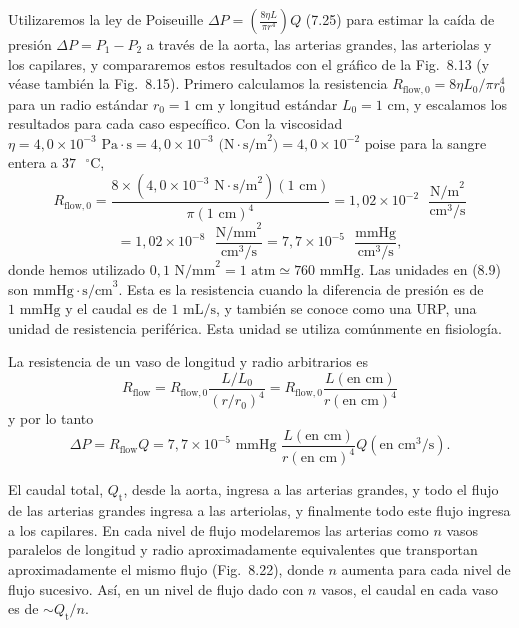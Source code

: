 \documentclass[12pt]{book}
\begin{document}
Utilizaremos la ley de Poiseuille $\Delta P = \left(\frac{8\eta L}{\pi r^4}\right) Q$ (7.25) para estimar la caída de presión $\Delta P = P_1 - P_2$ a través de la aorta, las arterias grandes, las arteriolas y los capilares, y compararemos estos resultados con el gráfico de la Fig.~8.13 (y véase también la Fig.~8.15). Primero calculamos la resistencia $R_{\text{flow},0} = 8\eta L_0/\pi r_0^4$ para un radio estándar $r_0 = 1\text{ cm}$ y longitud estándar $L_0 = 1\text{ cm}$, y escalamos los resultados para cada caso específico. Con la viscosidad $\eta = 4{,}0 \times 10^{-3}\text{ Pa}\cdot\text{s} = 4{,}0 \times 10^{-3}\text{ (N}\cdot\text{s/m}^2) = 4{,}0 \times 10^{-2}\text{ poise}$ para la sangre entera a $37\text{ }^\circ\text{C}$,
\begin{equation}
R_{\text{flow},0} = \frac{8 \times (4{,}0 \times 10^{-3}\text{ N}\cdot\text{s/m}^2)(1\text{ cm})}{\pi(1\text{ cm})^4} = 1{,}02 \times 10^{-2}\text{ }\frac{\text{N/m}^2}{\text{cm}^3\text{/s}}
\label{eq:88}
\end{equation}
\begin{equation}
= 1{,}02 \times 10^{-8}\text{ }\frac{\text{N/mm}^2}{\text{cm}^3\text{/s}} = 7{,}7 \times 10^{-5}\text{ }\frac{\text{mmHg}}{\text{cm}^3\text{/s}},
\label{eq:89}
\end{equation}
donde hemos utilizado $0{,}1\text{ N/mm}^2 = 1\text{ atm} \simeq 760\text{ mmHg}$. Las unidades en (8.9) son $\text{mmHg}\cdot\text{s/cm}^3$. Esta es la resistencia cuando la diferencia de presión es de $1\text{ mmHg}$ y el caudal es de $1\text{ mL/s}$, y también se conoce como una URP, una unidad de resistencia periférica. Esta unidad se utiliza comúnmente en fisiología.

La resistencia de un vaso de longitud y radio arbitrarios es
\begin{equation}
R_{\text{flow}} = R_{\text{flow},0} \frac{L/L_0}{(r/r_0)^4} = R_{\text{flow},0} \frac{L(\text{en cm})}{r(\text{en cm})^4}
\label{eq:810}
\end{equation}
y por lo tanto
\begin{equation}
\Delta P = R_{\text{flow}} Q = 7{,}7 \times 10^{-5}\text{ mmHg } \frac{L(\text{en cm})}{r(\text{en cm})^4} Q (\text{en cm}^3\text{/s}).
\label{eq:811}
\end{equation}

El caudal total, $Q_{\text{t}}$, desde la aorta, ingresa a las arterias grandes, y todo el flujo de las arterias grandes ingresa a las arteriolas, y finalmente todo este flujo ingresa a los capilares. En cada nivel de flujo modelaremos las arterias como $n$ vasos paralelos de longitud y radio aproximadamente equivalentes que transportan aproximadamente el mismo flujo (Fig.~8.22), donde $n$ aumenta para cada nivel de flujo sucesivo. Así, en un nivel de flujo dado con $n$ vasos, el caudal en cada vaso es de ${\sim}Q_{\text{t}}/n$.
\end{document}

